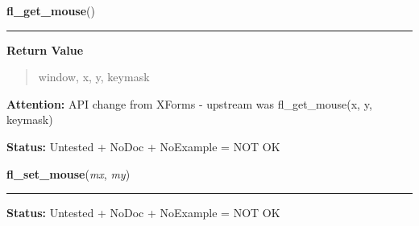     \vspace{0.5ex}

\hspace{.8\funcindent}\begin{boxedminipage}{\funcwidth}

    \raggedright \textbf{fl\_get\_mouse}()

    \vspace{-1.5ex}

    \rule{\textwidth}{0.5\fboxrule}
\setlength{\parskip}{2ex}
\setlength{\parskip}{1ex}
      \textbf{Return Value}
    \vspace{-1ex}

      \begin{quote}
      window, x, y, keymask

      \end{quote}

\textbf{Attention:} API change from XForms - upstream was fl\_get\_mouse(x, y, keymask)



\textbf{Status:} Untested + NoDoc + NoExample = NOT OK



    \end{boxedminipage}

    \label{xformslib:library:fl_set_mouse}

    \vspace{0.5ex}

\hspace{.8\funcindent}\begin{boxedminipage}{\funcwidth}

    \raggedright \textbf{fl\_set\_mouse}(\textit{mx}, \textit{my})

    \vspace{-1.5ex}

    \rule{\textwidth}{0.5\fboxrule}
\setlength{\parskip}{2ex}
\setlength{\parskip}{1ex}
\textbf{Status:} Untested + NoDoc + NoExample = NOT OK



    \end{boxedminipage}

    \label{xformslib:library:fl_get_win_mouse}

    \vspace{0.5ex}

